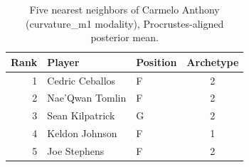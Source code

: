 \begin{table}[htbp]
  \centering\small
  \begin{tabular}{rllc}
    \toprule
    Rank & Player & Position & Archetype \\
    \midrule
    1 & Cedric Ceballos & F & 2 \\
    2 & Nae'Qwan Tomlin & F & 2 \\
    3 & Sean Kilpatrick & G & 2 \\
    4 & Keldon Johnson & F & 1 \\
    5 & Joe Stephens & F & 2 \\
    \bottomrule
  \end{tabular}
  \caption{Five nearest neighbors of Carmelo Anthony (curvature_m1 modality), Procrustes-aligned posterior mean.}
  \label{tab:Carmelo_Anthony_neighbors_curvature_m1}
\end{table}


